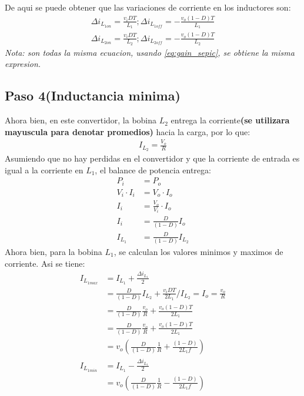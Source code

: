 De aqui se puede obtener que las variaciones de corriente en los inductores son:
\begin{align*}
    \Delta i_{L_{1on}}=\frac{v_iDT}{L_1};\Delta i_{L_{1off}}=-\frac{v_o(1-D)T}{L_1} \\
    \Delta i_{L_{2on}}=\frac{v_iDT}{L_2};\Delta i_{L_{2off}}=-\frac{v_o(1-D)T}{L_2}
\end{align*}
\textit{Nota: son todas la misma ecuacion, usando \autoref{eq:gain_sepic}, se obtiene la misma expresion.}
\subsection{Paso 4(Inductancia minima)}

Ahora bien, en este convertidor, la bobina $L_2$ entrega la corriente\textbf{(se utilizara mayuscula para denotar promedios)} hacia la carga, por lo que:
\begin{align*}
    I_{L_2}=\frac{V_o}{R}
\end{align*}
Asumiendo que no hay perdidas en el convertidor y que la corriente de entrada es igual a la corriente en $L_1$, el balance de potencia entrega:
\begin{align*}
    P_i&=P_o \\ 
    V_i\cdot I_i &= V_o \cdot I_o \\ 
    I_i&=\frac{V_o}{V_i}\cdot I_o \\
    I_i&=\frac{D}{(1-D)}I_o \\ 
    I_{L_1}&=\frac{D}{(1-D)}I_{L_2}
\end{align*}
Ahora bien, para la bobina $L_1$, se calculan los valores minimos y maximos de corriente. Asi se tiene:
\begin{align*}
    I_{L_{1max}}&=I_{L_1}+\frac{\Delta i_{L_1}}{2} \\ 
    &=\frac{D}{(1-D)}I_{L_2}+\frac{v_iDT}{2 L_1} \Big/ I_{L_2}=I_o=\frac{v_o}{R} \\ 
    &=\frac{D}{(1-D)}\frac{v_o}{R}+\frac{v_o(1-D)T}{2 L_1} \\ 
    &=\frac{D}{(1-D)}\frac{v_o}{R}+\frac{v_o(1-D)T}{2 L_1} \\ 
    &=v_o\left(\frac{D}{(1-D)}\frac{1}{R}+\frac{(1-D)}{2 L_1 f}\right) \\ 
    I_{L_{1min}}&=I_{L_1}-\frac{\Delta i_{L_1}}{2} \\ 
    &=v_o\left(\frac{D}{(1-D)}\frac{1}{R}-\frac{(1-D)}{2 L_1 f}\right) \\ 
\end{align*}

